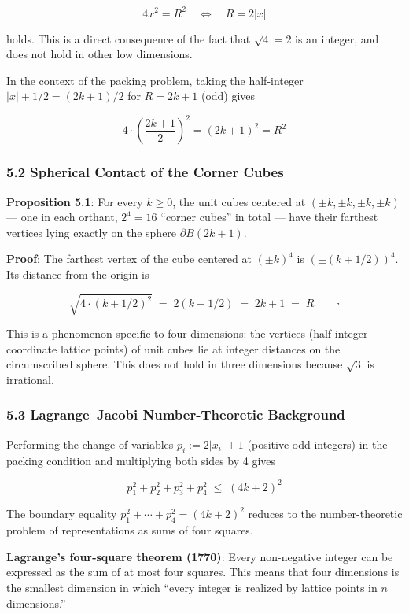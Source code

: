 \documentclass[a4paper,11pt]{article}
\theoremstyle{definition}
\begin{document}
\[4x^2 = R^2 \quad\Longleftrightarrow\quad R = 2|x|\]

holds. This is a direct consequence of the fact that \(\sqrt{4} = 2\) is
an integer, and does not hold in other low dimensions.

In the context of the packing problem, taking the half-integer
\(|x| + 1/2 = (2k+1)/2\) for \(R = 2k+1\) (odd) gives

\[4 \cdot \left(\frac{2k+1}{2}\right)^2 = (2k+1)^2 = R^2\]

\subsubsection{5.2 Spherical Contact of the Corner
Cubes}\label{spherical-contact-of-the-corner-cubes}

\textbf{Proposition 5.1}: For every \(k \ge 0\), the unit cubes centered
at \((\pm k, \pm k, \pm k, \pm k)\) --- one in each orthant,
\(2^4 = 16\) ``corner cubes'' in total --- have their farthest vertices
lying exactly on the sphere \(\partial B(2k+1)\).

\textbf{Proof}: The farthest vertex of the cube centered at
\((\pm k)^4\) is \((\pm(k+1/2))^4\). Its distance from the origin is

\[\sqrt{4 \cdot (k+1/2)^2} \;=\; 2(k+1/2) \;=\; 2k+1 \;=\; R \qquad \square\]

This is a phenomenon specific to four dimensions: the vertices
(half-integer-coordinate lattice points) of unit cubes lie at integer
distances on the circumscribed sphere. This does not hold in three
dimensions because \(\sqrt{3}\) is irrational.

\subsubsection{5.3 Lagrange--Jacobi Number-Theoretic
Background}\label{lagrangejacobi-number-theoretic-background}

Performing the change of variables \(p_i := 2|x_i| + 1\) (positive odd
integers) in the packing condition and multiplying both sides by 4 gives

\[p_1^2 + p_2^2 + p_3^2 + p_4^2 \;\le\; (4k+2)^2\]

The boundary equality \(p_1^2 + \cdots + p_4^2 = (4k+2)^2\) reduces to
the number-theoretic problem of representations as sums of four squares.

\textbf{Lagrange's four-square theorem (1770)}: Every non-negative
integer can be expressed as the sum of at most four squares. This means
that four dimensions is the smallest dimension in which ``every integer
is realized by lattice points in \(n\) dimensions.''
\end{document}
